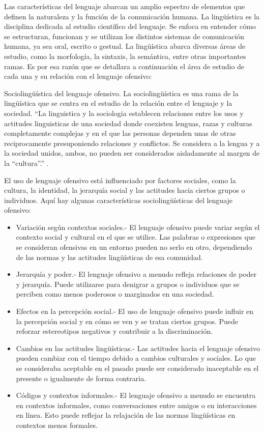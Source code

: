 Las características del lenguaje abarcan un amplio espectro de elementos que definen la naturaleza y la función de la comunicación humana. La lingüística es la disciplina dedicada al estudio científico del lenguaje. Se enfoca en entender cómo se estructuran, funcionan y se utilizan los distintos sistemas de comunicación humana, ya sea oral, escrito o gestual. La lingüística abarca diversas áreas de estudio, como la morfología, la sintaxis, la semántica, entre otras importantes ramas.  Es por esa razón que se detallara a continuación el área de estudio de cada una y su relación con el lenguaje ofensivo:

Sociolingüística del lenguaje ofensivo. La sociolingüística es una rama de la lingüística que se centra en el estudio de la relación entre el lenguaje y la sociedad. ``La linguistica y la sociologia establecen relaciones entre los usos y actitudes linguisticas de una sociedad donde coexisten lenguas, razas y culturas completamente complejas y en el que las personas dependen unas de otras reciprocamente presuponiendo relaciones y conflictos. Se considera a la lengua y a la sociedad unidos, ambos, no pueden ser considerados aisladamente al margen de la ``cultura''.'' \cite{prado2004analisis}.

El uso de lenguaje ofensivo está influenciado por factores sociales, como la cultura, la identidad, la jerarquía social y las actitudes hacia ciertos grupos o individuos. Aquí hay algunas características sociolingüísticas del lenguaje ofensivo:

\begin{itemize}
		\item Variación según contextos sociales.- El lenguaje ofensivo puede variar según el contexto social y cultural en el que se utilice. Las palabras o expresiones que se consideran ofensivas en un entorno pueden no serlo en otro, dependiendo de las normas y las actitudes lingüísticas de esa comunidad.
		\item Jerarquía y poder.-  El lenguaje ofensivo a menudo refleja relaciones de poder y jerarquía. Puede utilizarse para denigrar a grupos o individuos que se perciben como menos poderosos o marginados en una sociedad.
		\item Efectos en la percepción social.- El uso de lenguaje ofensivo puede influir en la percepción social y en cómo se ven y se tratan ciertos grupos. Puede reforzar estereotipos negativos y contribuir a la discriminación. 
		\item Cambios en las actitudes lingüísticas.- Las actitudes hacia el lenguaje ofensivo pueden cambiar con el tiempo debido a cambios culturales y sociales. Lo que se consideraba aceptable en el pasado puede ser considerado inaceptable en el presente o igualmente de forma contraria.
		\item Códigos y contextos informales.- El lenguaje ofensivo a menudo se encuentra en contextos informales, como conversaciones entre amigos o en interacciones en línea. Esto puede reflejar la relajación de las normas lingüísticas en contextos menos formales.

\end{itemize}

